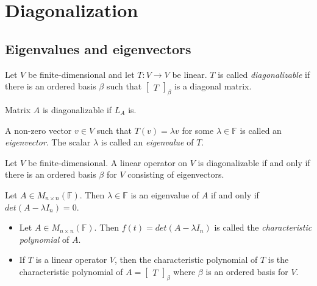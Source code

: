 \documentclass[12pt]{article}
\newenvironment{theorem}[2][Theorem]{\begin{trivlist}
\item[\hskip \labelsep {\bfseries #1}\hskip \labelsep {\bfseries #2.}]}{\end{trivlist}}
\newenvironment{definition}[2][Definition]{\begin{trivlist}
\item[\hskip \labelsep {\bfseries #1}\hskip \labelsep {\bfseries #2}]}{\end{trivlist}}
\begin{document}
\section{Diagonalization}

\subsection{Eigenvalues and eigenvectors}

\begin{definition}{1}
Let $V$ be finite-dimensional and let $T : V \to V$ be linear. $T$ is called \textit{diagonalizable} if there is an ordered basis $\beta$ such that $\begin{bmatrix} T \end{bmatrix}_\beta$ is a diagonal matrix.
\end{definition}

\noindent Matrix $A$ is diagonalizable if $L_A$ is.

\begin{definition}{2}
A non-zero vector $v \in V$ such that $T(v) = \lambda v$ for some $\lambda \in \mathbb{F}$ is called an \textit{eigenvector}. The scalar $\lambda$ is called an \textit{eigenvalue} of $T$.
\end{definition}

\begin{theorem}{5.1}
Let $V$ be finite-dimensional. A linear operator on $V$ is diagonalizable if and only if there is an ordered basis $\beta$ for $V$ consisting of eigenvectors.
\end{theorem}

\begin{theorem}{5.2}
Let $A \in M_{n \times n}(\mathbb{F})$. Then $\lambda \in \mathbb{F}$ is an eigenvalue of $A$ if and only if $det(A - \lambda I_n) = 0$.
\end{theorem}

\begin{definition}{3} \text{ }
\begin{itemize}
    \item Let $A \in M_{n \times n}(\mathbb{F})$. Then $f(t) = det(A - \lambda I_n)$ is called the \textit{characteristic polynomial} of $A$.
    
    \item If $T$ is a linear operator $V$, then the characteristic polynomial of $T$ is the characteristic polynomial of $A = \begin{bmatrix} T \end{bmatrix}_\beta$ where $\beta$ is an ordered basis for $V$.
\end{itemize}
\end{definition}
\end{document}

